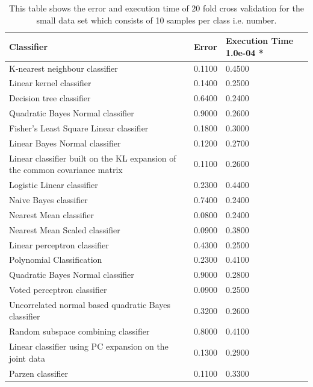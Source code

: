 \documentclass[%
        compressed,
        final,
        notitlepage,
        narroweqnarray,
        inline,
        twoside,
        ]{ieee}
\begin{document}
\begin{table}
    \begin{tabular} {p{5cm}lp{1.5cm}} %
        \hline
    Classifier & Error & Execution Time 1.0e-04 * \\
        \hline
    K-nearest neighbour classifier & 0.1100 & 0.4500 \\
    Linear kernel classifier & 0.1400 & 0.2500 \\
    Decision tree classifier & 0.6400 & 0.2400 \\
    Quadratic Bayes Normal classifier & 0.9000 & 0.2600 \\
    Fisher's Least Square Linear classifier & 0.1800 & 0.3000 \\
    Linear Bayes Normal classifier & 0.1200 & 0.2700 \\
    Linear classifier built on the KL expansion of the common covariance matrix & 0.1100 & 0.2600 \\
    Logistic Linear classifier & 0.2300 & 0.4400 \\
    Naive Bayes classifier & 0.7400 & 0.2400 \\
    Nearest Mean classifier & 0.0800 & 0.2400 \\
    Nearest Mean Scaled classifier & 0.0900 & 0.3800 \\
    Linear perceptron classifier & 0.4300 & 0.2500 \\
    Polynomial Classification & 0.2300 & 0.4100 \\
    Quadratic Bayes Normal classifier & 0.9000 & 0.2800 \\
    Voted perceptron classifier & 0.0900 & 0.2500 \\
    Uncorrelated normal based quadratic Bayes classifier & 0.3200 & 0.2600 \\
    Random subspace combining classifier & 0.8000 & 0.4100 \\
        Linear classifier using PC expansion on the joint data & 0.1300 & 0.2900 \\
    Parzen classifier & 0.1100 & 0.3300 \\
        \hline
    \end{tabular}
    \caption{This table shows the error and execution time of 20 fold cross
    validation for the small data set which consists of 10 samples per class
i.e. number.}
\end{table}
\end{document}
